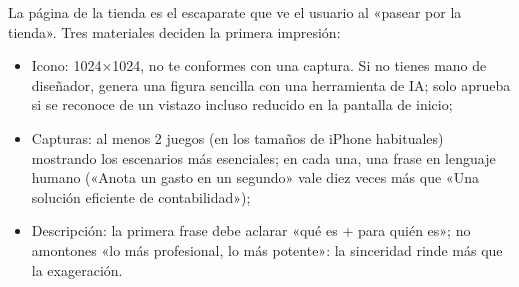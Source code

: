 
La página de la tienda es el escaparate que ve el usuario al «pasear por la tienda». Tres materiales deciden la primera impresión:

\begin{itemize}
  \item Icono: 1024×1024, no te conformes con una captura. Si no tienes mano de diseñador, genera una figura sencilla con una herramienta de IA; solo aprueba si se reconoce de un vistazo incluso reducido en la pantalla de inicio;
  \item Capturas: al menos 2 juegos (en los tamaños de iPhone habituales) mostrando los escenarios más esenciales; en cada una, una frase en lenguaje humano («Anota un gasto en un segundo» vale diez veces más que «Una solución eficiente de contabilidad»);
  \item Descripción: la primera frase debe aclarar «qué es + para quién es»; no amontones «lo más profesional, lo más potente»: la sinceridad rinde más que la exageración.
\end{itemize}

